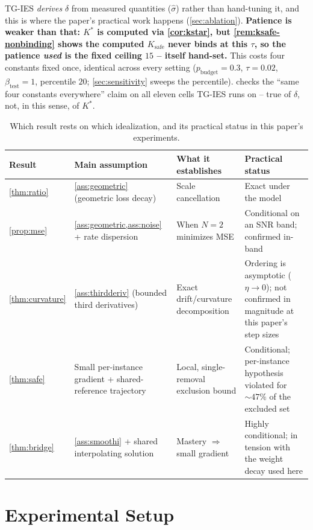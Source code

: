 \documentclass{article}
\theoremstyle{plain}
\theoremstyle{definition}
\theoremstyle{remark}
\begin{document}
TG-IES \emph{derives} $\delta$ from measured quantities ($\hat\sigma$) rather than hand-tuning it, and this is where the paper's practical work happens (\cref{sec:ablation}). \textbf{Patience is weaker than that: $K^*$ is computed via \cref{cor:kstar}, but \cref{rem:ksafe-nonbinding} shows the computed $K_{\mathrm{safe}}$ never binds at this $\tau$, so the patience \emph{used} is the fixed ceiling $15$ -- itself hand-set.} This costs four constants fixed once, identical across every setting ($p_{\mathrm{budget}}=0.3$, $\tau=0.02$, $\beta_{\mathrm{test}}=1$, percentile $20$; \cref{sec:sensitivity} sweeps the percentile).  checks the ``same four constants everywhere'' claim on all eleven cells TG-IES runs on -- true of $\delta$, not, in this sense, of $K^*$.

\begin{table}[h]
\caption{Which result rests on which idealization, and its practical status in this paper's experiments.}
\label{tab:hierarchy}
\centering
\small
\begin{tabular}{p{2.2cm}p{3.6cm}p{3.3cm}p{2.7cm}}
\toprule
Result & Main assumption & What it establishes & Practical status \\
\midrule
\cref{thm:ratio} & \cref{ass:geometric} (geometric loss decay) & Scale cancellation & Exact under the model \\
\cref{prop:mse} & \cref{ass:geometric,ass:noise} + rate dispersion & When $N{=}2$ minimizes MSE & Conditional on an SNR band; confirmed in-band \\
\cref{thm:curvature} & \cref{ass:thirdderiv} (bounded third derivatives) & Exact drift/curvature decomposition & Ordering is asymptotic ($\eta\to0$); not confirmed in magnitude at this paper's step sizes \\
\cref{thm:safe} & Small per-instance gradient + shared-reference trajectory & Local, single-removal exclusion bound & Conditional; per-instance hypothesis violated for $\sim\!47\%$ of the excluded set \\
\cref{thm:bridge} & \cref{ass:smoothi} + shared interpolating solution & Mastery $\Rightarrow$ small gradient & Highly conditional; in tension with the weight decay used here \\
\bottomrule
\end{tabular}
\end{table}

\section{Experimental Setup}
\label{sec:setup}
\end{document}
